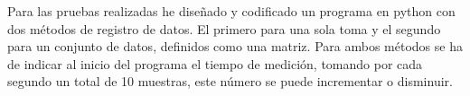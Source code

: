 
Para las pruebas realizadas he diseñado y codificado un programa en python con dos métodos de registro de datos. El primero para una sola toma y el segundo para un conjunto de datos, definidos como una matriz. Para ambos métodos se ha de indicar al inicio del programa el tiempo de medición, tomando por cada segundo un total de 10 muestras, este número se puede incrementar o disminuir.

